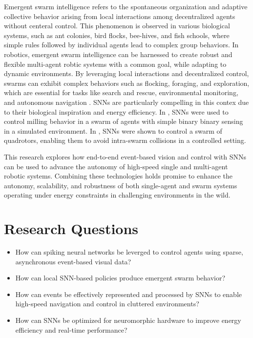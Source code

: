 \documentclass{article}
\begin{document}
Emergent swarm intelligence refers to the spontaneous organization and adaptive collective behavior arising from local interactions among decentralized agents without centeral control. This phenomenon is observed in various biological systems, such as ant colonies, bird flocks, bee-hives, and fish schools, where simple rules followed by individual agents lead to complex group behaviors. In robotics, emergent swarm intelligence can be harnessed to create robust and flexible multi-agent robtic systems with a common goal, while adapting to dynamic environments. By leveraging local interactions and decentralized control, swarms can exhibit complex behaviors such as flocking, foraging, and exploration, which are essential for tasks like search and rescue, environmental monitoring, and autonomous navigation \cite{debieSwarmRoboticsSurvey2023}. SNNs are particularly compelling in this contex due to their biological inspiration and energy efficiency. In \cite{zhuSpikingNeuralNetworks2024}, SNNs were used to control milling behavior in a swarm of agents with simple binary binary sensing in a simulated environment. In \cite{zhaoNatureinspiredSelforganizingCollision2022}, SNNs were shown to control a swarm of quadrotors, enabling them to avoid intra-swarm collisions in a controlled setting. 

This research explores how end-to-end event-based vision and control with SNNs can be used to advance the autonomy of high-speed single and multi-agent robotic systems. Combining these technologies holds promise to enhance the autonomy, scalability, and robustness of both single-agent and swarm systems operating under energy constraints in challenging environments in the wild.

\section{Research Questions}
\begin{itemize}
    \item How can spiking neural networks be leverged to control agents using sparse, asynchronous event-based visual data?
    \item How can local SNN-based policies produce emergent swarm behavior?
    \item How can events be effectively represented and processed by SNNs to enable high-speed navigation and control in cluttered environments?
    \item How can SNNs be optimized for neuromorphic hardware to improve energy efficiency and real-time performance?
\end{itemize}
\end{document}

